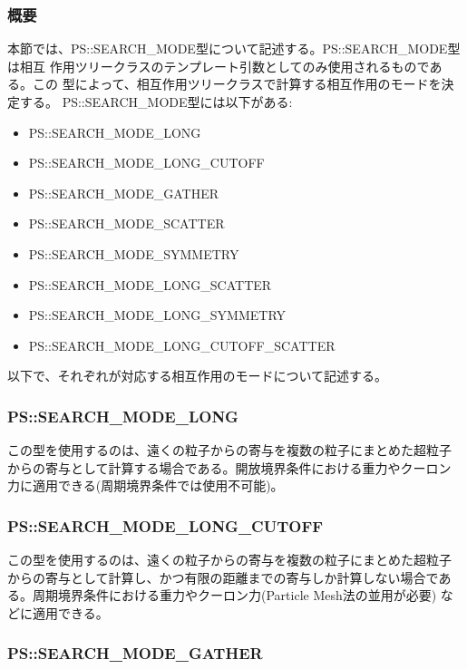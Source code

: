 \subsubsection{概要}

本節では、PS::SEARCH\_MODE型について記述する。PS::SEARCH\_MODE型は相互
作用ツリークラスのテンプレート引数としてのみ使用されるものである。この
型によって、相互作用ツリークラスで計算する相互作用のモードを決定する。
PS::SEARCH\_MODE型には以下がある:
\begin{itemize}
\item PS::SEARCH\_MODE\_LONG
\item PS::SEARCH\_MODE\_LONG\_CUTOFF
\item PS::SEARCH\_MODE\_GATHER
\item PS::SEARCH\_MODE\_SCATTER
\item PS::SEARCH\_MODE\_SYMMETRY
\item PS::SEARCH\_MODE\_LONG\_SCATTER
\item PS::SEARCH\_MODE\_LONG\_SYMMETRY
\item PS::SEARCH\_MODE\_LONG\_CUTOFF\_SCATTER
\end{itemize}
以下で、それぞれが対応する相互作用のモードについて記述する。

\subsubsection{PS::SEARCH\_MODE\_LONG}

この型を使用するのは、遠くの粒子からの寄与を複数の粒子にまとめた超粒子
からの寄与として計算する場合である。開放境界条件における重力やクーロン
力に適用できる(周期境界条件では使用不可能)。

\subsubsection{PS::SEARCH\_MODE\_LONG\_CUTOFF}

この型を使用するのは、遠くの粒子からの寄与を複数の粒子にまとめた超粒子
からの寄与として計算し、かつ有限の距離までの寄与しか計算しない場合であ
る。周期境界条件における重力やクーロン力(Particle Mesh法の並用が必要)
などに適用できる。

\subsubsection{PS::SEARCH\_MODE\_GATHER}

